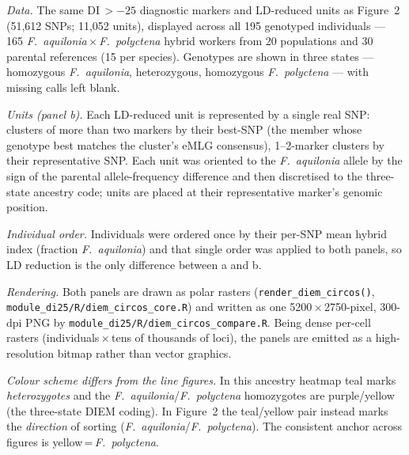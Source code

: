 \documentclass[11pt]{article}
\newcommand{\Faq}{\textit{F.~aquilonia}}
\newcommand{\Fpo}{\textit{F.~polyctena}}
\begin{document}
{%
\emph{Data.} The same DI\,$>-25$ diagnostic markers and LD-reduced units as Figure~2
(51{,}612 SNPs; 11{,}052 units), displayed across all 195 genotyped individuals --- 165
\Faq{}\,$\times$\,\Fpo{} hybrid workers from 20 populations and 30 parental references (15 per
species). Genotypes are shown in three states --- homozygous \Faq{}, heterozygous, homozygous
\Fpo{} --- with missing calls left blank.

\emph{Units (panel b).} Each LD-reduced unit is represented by a single real SNP:
clusters of more than two markers by their best-SNP (the member whose genotype best matches
the cluster's eMLG consensus), 1--2-marker clusters by their representative SNP. Each unit was oriented to the
\Faq{} allele by the sign of the parental allele-frequency difference and then discretised to
the three-state ancestry code; units are placed at their representative marker's genomic
position.

\emph{Individual order.} Individuals were ordered once by their per-SNP mean hybrid index
(fraction \Faq{}) and that single order was applied to both panels, so LD reduction is the
only difference between a and b.

\emph{Rendering.} Both panels are drawn as polar rasters
(\texttt{render\_diem\_circos()}, \texttt{module\_di25/R/diem\_circos\_core.R}) and written as
one 5200\,$\times$\,2750-pixel, 300-dpi PNG by
\texttt{module\_di25/R/diem\_circos\_compare.R}. Being dense per-cell rasters
(individuals\,$\times$\,tens of thousands of loci), the panels are emitted as a
high-resolution bitmap rather than vector graphics.}
{%
\emph{Colour scheme differs from the line figures.} In this ancestry heatmap teal marks
\emph{heterozygotes} and the \Faq{}/\Fpo{} homozygotes are purple/yellow (the three-state
DIEM coding). In Figure~2 the teal/yellow pair instead marks the \emph{direction} of
sorting (\Faq{}/\Fpo{}). The consistent anchor across figures is yellow\,=\,\Fpo{}.}
\end{document}
